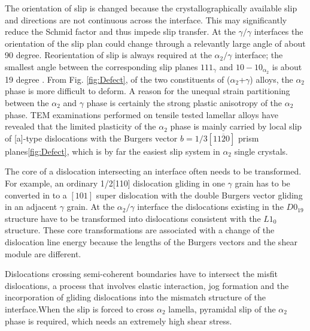 \documentclass[metals,article,submit,moreauthors,pdftex,10pt,a4paper]{Definitions/mdpi}
\begin{document}
The orientation of slip is changed because the crystallographically available slip and directions are not continuous across the interface. This may significantly reduce the Schmid factor and thus impede slip transfer. At the $\gamma/\gamma$ interfaces the orientation of the slip plan could change through a relevantly large angle of about 90 degree. Reorientation of slip is always required at the $\alpha_{2}/\gamma$ interface; the smallest angle between the corresponding slip planes ${1 1 1}_{\gamma}$ and ${ 1 0 -1 0}_{\alpha_2}$ is about 19 degree \cite{}. From Fig. \ref{fig:Defect}, of the two constituents of ($\alpha_2$+$\gamma$) alloys, the $\alpha_2$ phase is more difficult to deform. A reason for the unequal strain partitioning between the $\alpha_2$ and $\gamma$ phase is certainly the strong plastic anisotropy of the $\alpha_2$ phase. TEM examinations performed on tensile tested lamellar alloys have revealed that the limited plasticity of the $\alpha_2$ phase is mainly carried by local slip of [a]-type dislocations with the Burgers vector $b=1/3[11\overline{2}0]$ prism planes\ref{fig:Defect}, which is by far the easiest slip system in $\alpha_2$ single crystals. 




	
The core of a dislocation intersecting an interface often needs to be transformed. For example, an ordinary 1/2[110] dislocation gliding in one $\gamma$ grain has to be converted in to a $[101]$ super dislocation with the double Burgers vector gliding in an adjacent $\gamma$ grain. At the $\alpha_2/\gamma$ interface the dislocations existing in the $D0_{19}$ structure have to be transformed into dislocations consistent with the $L1_0$structure. These core transformations are associated with a change of the dislocation line energy because the lengths of the Burgers vectors and the shear module are different.

Dislocations crossing semi-coherent boundaries have to intersect the misfit dislocations, a process that involves elastic interaction, jog formation and the incorporation of gliding dislocations into the mismatch structure of the interface.When the slip is forced to cross $\alpha_2$ lamella, pyramidal slip of the $\alpha_2$ phase is required, which needs an extremely high shear stress.
\end{document}
